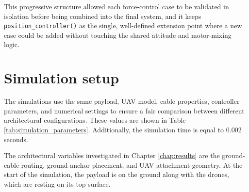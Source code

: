 This progressive structure allowed each force-control case to be validated in isolation before being combined into the final system, and it keeps \texttt{position\_controller()} as the single, well-defined extension point where a new case could be added without touching the shared attitude and motor-mixing logic.

\newpage
\section{Simulation setup}
The simulations use the same payload, UAV model, cable properties, controller parameters, and numerical settings to ensure a fair comparison between different architectural configurations. These values are shown in Table \ref{tab:simulation_parameters}. Additionally, the simulation time is equal to 0.002 seconds.


The architectural variables investigated in Chapter \ref{chap:results} are the ground-cable routing, ground-anchor placement, and UAV attachment geometry. At the start of the simulation, the payload is on the ground along with the drones, which are resting on its top surface.

